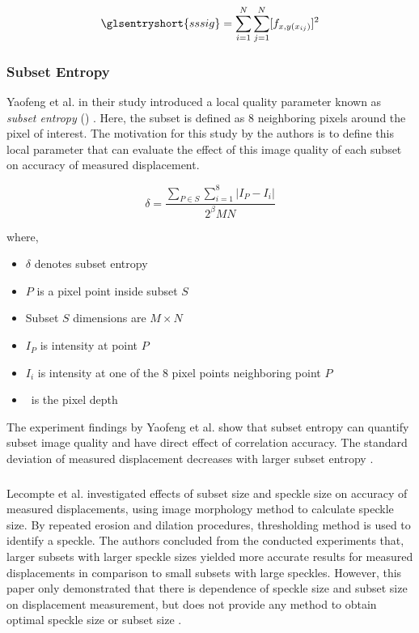     \begin{equation}
        \glsentryshort{sssig} = \displaystyle \sum_{i=1}^N \displaystyle \sum_{j=1}^N [f_{x,y(x_{ij})}]^2
    \end{equation}
    
    \subsubsection{Subset Entropy}
        Yaofeng et al. in their study introduced a local quality parameter known as \emph{subset entropy} (\delta) \cite{yaofeng}. Here, the subset is defined as 8 neighboring pixels around the pixel of interest. The motivation for this study by the authors is to define this local parameter that can evaluate the effect of this image quality of each subset on accuracy of measured displacement.

        \begin{equation}
            \delta = \dfrac{\sum_{P \in S} \sum_{i=1}^{8}|I_P - I_i|}{2^\beta MN}
        \end{equation}

        where,
        \begin{itemize} 
            \item $\delta$ denotes subset entropy
            \item $P$ is a pixel point inside subset $S$
            \item Subset $S$ dimensions are $M\times N$
            \item $I_P$ is intensity at point $P$
            \item $I_i$ is intensity at one of the 8 pixel points neighboring point $P$
            \item \beta\ is the pixel depth
        \end{itemize}

        \noindent The experiment findings by Yaofeng et al. show that subset entropy can quantify subset image quality and have direct effect of correlation accuracy. The standard deviation of measured displacement decreases with larger subset entropy \cite{yaofeng}.

        \subsubsection{}
        Lecompte et al. investigated effects of subset size and speckle size on accuracy of measured displacements, using image morphology method to calculate speckle size. By repeated erosion and dilation procedures, thresholding method is used to identify a speckle. The authors concluded from the conducted experiments that, larger subsets with larger speckle sizes yielded more accurate results for measured displacements in comparison to small subsets with large speckles. However, this paper only demonstrated that there is dependence of speckle size and subset size on displacement measurement, but does not provide any method to obtain optimal speckle size or subset size \cite{lecompte}.

